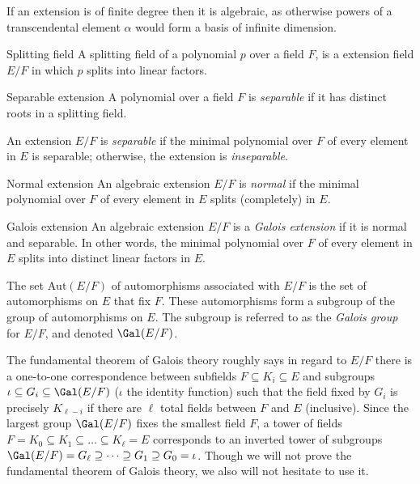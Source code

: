 If an extension is of finite degree then it is algebraic, as otherwise powers of a transcendental element $\alpha$ would form a basis of infinite dimension.

\begin{definition}{Splitting field}
    A splitting field of a polynomial $p$ over a field $F$, is a extension field $E/F$ in which $p$ splits into linear factors.
\end{definition}

\begin{definition}{Separable extension}
    A polynomial over a field $F$ is \emph{separable} if it has distinct roots in a splitting field.
    
    An extension $E/F$ is \emph{separable} if the minimal polynomial over $F$ of every element in $E$ is separable; otherwise, the extension is \emph{inseparable}.
\end{definition}

\begin{definition}{Normal extension}
    An algebraic extension $E/F$ is \emph{normal} if the minimal polynomial over $F$ of every element in $E$ splits (completely) in $E$.
\end{definition}

\begin{definition}{Galois extension}
    An algebraic extension $E/F$ is a \emph{Galois extension} if it is normal and separable.
    In other words, the minimal polynomial over $F$ of every element in $E$ splits into distinct linear factors in $E$.

    The set $\text{Aut}(E/F)$ of automorphisms associated with $E/F$ is the set of automorphisms on $E$ that fix $F$.
    These automorphisms form a subgroup of the group of automorphisms on $E$.
    The subgroup is referred to as the \emph{Galois group} for $E/F$, and denoted $\Gal(E/F)$.
\end{definition}

The fundamental theorem of Galois theory roughly says in regard to $E/F$ there is a one-to-one correspondence between subfields $F\subseteq K_i\subseteq E$ and subgroups $\iota\subseteq G_i\subseteq\Gal(E/F)$ ($\iota$ the identity function) such that the field fixed by $G_i$ is precisely $K_{\ell-i}$ if there are $\ell$ total fields between $F$ and $E$ (inclusive).
Since the largest group $\Gal(E/F)$ fixes the smallest field $F$, a tower of fields $F=K_0\subseteq K_1\subseteq\dots\subseteq K_\ell=E$ corresponds to an inverted tower of subgroups $\Gal(E/F)=G_\ell\supseteq\dots\supseteq G_1\supseteq G_0=\iota$.
Though we will not prove the fundamental theorem of Galois theory, we also will not hesitate to use it.


